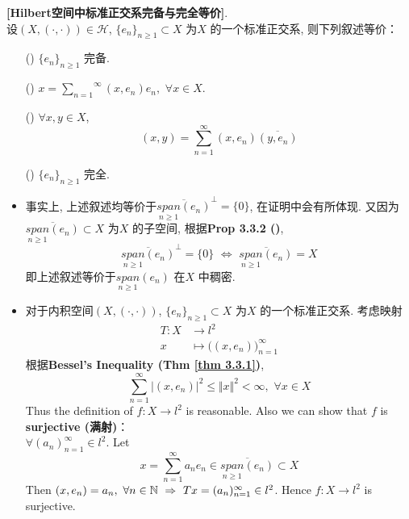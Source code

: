 	\begin{thm}\label{thm 3.4.2}
		\textbf{[Hilbert空间中标准正交系完备与完全等价]}. \\
		设$(X , (\cdot , \cdot)) \in \mathcal{H}$, $\{ e_n \}_{n \geq 1} \subset X$ 为$X$ 的一个标准正交系, 则下列叙述等价：
		\begin{enumerate}
			\item[(\rmnum{1})] $\{ e_n \}_{n \geq 1}$ 完备. 
			
			
			\item[(\rmnum{2})] $x = \overset{\infty}{\underset{n = 1}{\sum}} (x , e_n) e_n , \,\, \forall x \in X$. 
			
			
			\item[(\rmnum{3})] $\forall x , y \in X$, 
			\[ (x , y) = \sum_{n = 1}^{\infty} (x , e_n) \overline{(y , e_n)} \]
			
			
			\item[(\rmnum{4})] $\{ e_n \}_{n \geq 1}$ 完全.
		\end{enumerate}
		
		\vspace{4em}
		
		\begin{rmk}
			\begin{itemize}
				\item 事实上, 上述叙述均等价于$\overline{\underset{n \geq 1}{span} (e_n)}^{\perp} = \{ 0 \}$, 在证明中会有所体现. 又因为$\overline{\underset{n \geq 1}{span} (e_n)} \subset X$ 为$X$ 的子空间, 根据\textbf{Prop 3.3.2 ()}, 
				\[ \overline{\underset{n \geq 1}{span} (e_n)}^{\perp} = \{ 0 \} \,\, \Leftrightarrow \,\, \overline{\underset{n \geq 1}{span} (e_n)} = X \]
				即上述叙述等价于$\underset{n \geq 1}{span} (e_n)$ 在$X$ 中稠密. 
				
				\newpage
				
				\item 对于内积空间$(X , (\cdot , \cdot))$, $\{ e_n \}_{n \geq 1} \subset X$ 为$X$ 的一个标准正交系. 考虑映射
				\begin{align}
					T : X &\longrightarrow l^2 \\
					x &\longmapsto \Big( (x , e_n) \Big)_{n = 1}^{\infty}
				\end{align}
				根据\textbf{Bessel's Inequality (Thm \ref{thm 3.3.1})}, 
				\[ \sum_{n = 1}^{\infty} \Big| (x  , e_n) \Big|^2 \leq \Vert x \Vert^2 < \infty , \,\, \forall x \in X \]
				Thus the definition of $f : X \longrightarrow l^2$ is reasonable. Also we can show that $f$ is \textbf{surjective (满射)}：\\
				$\forall (a_n)_{n = 1}^{\infty} \in l^2$. Let 
				\[ x = \sum_{n = 1}^{\infty} a_n e_n \in \overline{\underset{n \geq 1}{span} (e_n)} \subset X \]
				Then $(x , e_n) = a_n , \,\, \forall n \in \mathbb{N} \,\, \Rightarrow \,\, Tx = (a_n)_{n = 1}^{\infty} \in l^2$. Hence $f : X \longrightarrow l^2$ is surjective. 
				

\end{itemize}
\end{rmk}
\end{thm}
